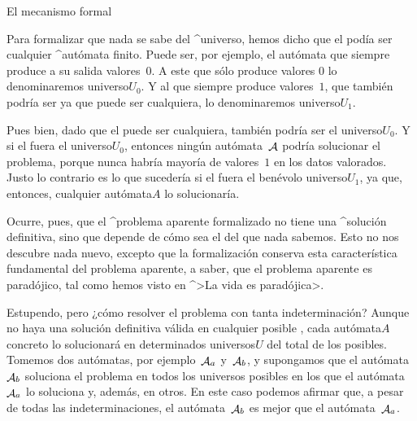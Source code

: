 \Section El mecanismo formal

Para formalizar que nada se sabe del ^{universo}, hemos dicho que el
{\universo} podía ser cualquier ^{autómata} finito. Puede ser, por
ejemplo, el autómata que siempre produce a su salida valores~$0$. A este
{\universo} que sólo produce valores $0$ lo denominaremos \corporal
universo$U_0$. Y al que siempre produce valores~$1$, que también podría
ser ya que puede ser cualquiera, lo denominaremos \corporal
universo$U_1$.


Pues bien, dado que el {\universo} puede ser cualquiera, también podría
ser el \corporal universo$U_0$. Y si el {\universo} fuera el \corporal
universo$U_0$, entonces ningún autómata~$\aut A$ podría solucionar el
problema, porque nunca habría mayoría de valores~$1$ en los datos
valorados. Justo lo contrario es lo que sucedería si el {\universo}
fuera el benévolo \corporal universo$U_1$, ya que, entonces, cualquier
\corporal autómata$A$ lo solucionaría.

Ocurre, pues, que el ^{problema aparente formalizado} no tiene una
^{solución} definitiva, sino que depende de cómo sea el {\universo} del
que nada sabemos. Esto no nos descubre nada nuevo, excepto que la
formalización conserva esta característica fundamental del problema
aparente, a saber, que el problema aparente es paradójico, tal como
hemos visto en ^>La vida es paradójica>.

Estupendo, pero ¿cómo resolver el problema con tanta indeterminación?
Aunque no haya una solución definitiva válida en cualquier posible
{\universo}, cada \corporal autómata$A$ concreto lo solucionará en
determinados \corporal universos$U$ del total de los posibles. Tomemos
dos autómatas, por ejemplo~$\aut A_a$ y~$\aut A_b$, y supongamos que el
autómata~$\aut A_b$ soluciona el problema en todos los universos
posibles en los que el autómata~$\aut A_a$ lo soluciona y, además, en
otros. En este caso podemos afirmar que, a pesar de todas las
indeterminaciones, el autómata~$\aut A_b$ es mejor que el autómata~$\aut
A_a$.

